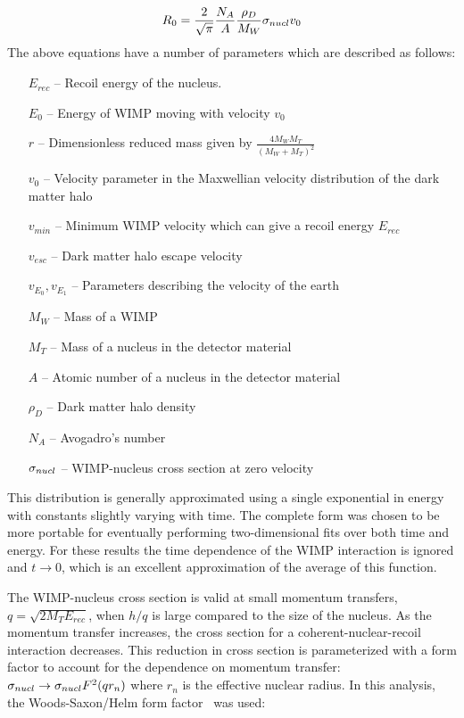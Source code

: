 		\[
			R_{0} = \frac{2}{\sqrt{\pi}} \frac{N_{A}}{A} \frac{\rho_{D}}{M_{W}} \sigma_{nucl} v_{0}
		\]
The above equations have a number of parameters which are described as follows:

		\begin{itemize}
			\item[$E_{rec}$]  -- Recoil energy of the nucleus. 
			\item[$E_{0}$] -- Energy of WIMP moving with velocity $v_{0}$
			\item[$r$] 	-- Dimensionless reduced mass given by 
					$\frac{4 M_{W} M_{T}}{(M_{W} + M_{T})^{2}}$
			\item[$v_{0}$] -- Velocity parameter in the Maxwellian velocity distribution of 
						the dark matter halo
			\item[$v_{min}$] -- Minimum WIMP velocity which can give a recoil energy $E_{rec}$
			\item[$v_{esc}$] -- Dark matter halo escape velocity
			\item[$v_{E_{0}}, v_{E_{1}}$] -- Parameters describing the velocity of the earth
			\item[$M_{W}$] -- Mass of a WIMP
			\item[$M_{T}$] -- Mass of a nucleus in the detector material
			\item[$A$] -- Atomic number of a nucleus in the detector material
			\item[$\rho_{D}$] -- Dark matter halo density	
			\item[$N_{A}$] -- Avogadro's number
			\item[$\sigma_{nucl}$] -- WIMP-nucleus cross section at zero velocity
		\end{itemize}			
This distribution is generally approximated using a single exponential in energy with constants slightly varying with time.  The complete form was chosen to be more portable for eventually performing two-dimensional fits over both time and energy.  For these results the time dependence of the WIMP interaction is ignored and $t\to0$, which is an excellent approximation of the average of this function.  

The WIMP-nucleus cross section is valid at small momentum transfers, $q = \sqrt{2 M_{T} E_{rec}}$, when $h/q$ is large compared to the size of the nucleus.  As the momentum transfer increases, the cross section for a coherent-nuclear-recoil interaction decreases.  This reduction in cross section is parameterized with a form factor to account for the dependence on momentum transfer: $\sigma_{nucl} \to \sigma_{nucl} F^{2} (q r_{n})$ where $r_{n}$ is the effective nuclear radius.  In this analysis, the Woods-Saxon/Helm form factor~\cite{Helm56} was used:

